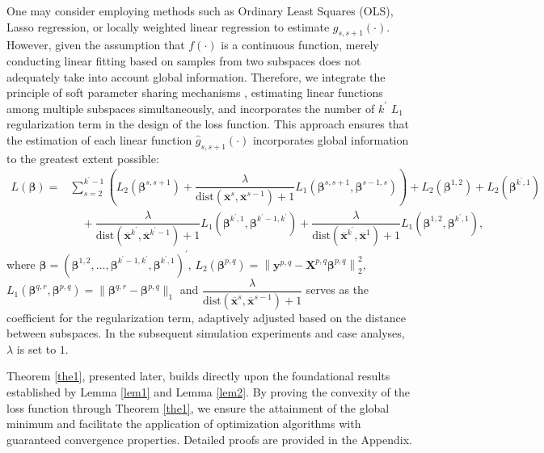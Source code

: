 \documentclass[final,3p,times]{elsarticle}
\begin{document}
One may consider employing methods such as Ordinary Least Squares 
(OLS), Lasso regression, or locally weighted linear regression to 
estimate $g_{s,s+1}(\cdot)$. 
However, given the assumption that $f(\cdot)$ is a continuous 
function, merely conducting linear fitting based on samples from 
two subspaces does not adequately take into account global 
information. Therefore, we integrate the principle of soft 
parameter sharing mechanisms \cite{bib70}, estimating linear functions 
among multiple subspaces simultaneously, and incorporates the number of $k^\prime$ 
$L_1$ regularization term in the design of the loss function. This approach ensures that the estimation of each linear function 
$\hat{g}_{s,s+1}(\cdot)$ incorporates global information to the 
greatest extent possible:
\begin{equation} 
\label{eq8}
\begin{aligned}
L(\boldsymbol{\beta})=
&\sum\limits_{s=2}^{k^\prime-1}
\left(L_2(\boldsymbol{\beta}^{s,s+1})+\dfrac{\lambda}
{\text{dist}(\overline{\boldsymbol{x}}^{s},
\overline{\boldsymbol{x}}^{s-1})+1} 
L_1(\boldsymbol
{\beta}^{s,s+1},\boldsymbol{\beta}^{s-1,s}) \right) 
+L_2(\boldsymbol{\beta}^{1,2})+L_2(\boldsymbol{\beta}
^{k^\prime,1}) \\
&\quad+\dfrac{\lambda}{\text{dist}(
  \overline{\boldsymbol{x}}^{k^\prime},\overline
  {\boldsymbol{x}}^{k^\prime-1})+1}L_1(\boldsymbol{\beta}^{k^\prime,1},
  \boldsymbol{\beta}^{k^\prime-1,k^\prime})+\dfrac{\lambda}{\text{dist}(
\overline{\boldsymbol{x}}^{k^\prime},\overline
{\boldsymbol{x}}^{1})+1}L_1(\boldsymbol{\beta}^{1,2},
\boldsymbol{\beta}^{k^\prime,1}), 
\end{aligned}
\end{equation}
where $\boldsymbol{\beta}=\left(\boldsymbol{\beta}
^{1,2},\ldots,\boldsymbol
{\beta}^{k^\prime-1,k^\prime},\boldsymbol{\beta}^
{k^\prime,1}\right)^\prime$, $L_2(\boldsymbol{\beta}
^{p,q})=\left\|\boldsymbol{y}^{p, q}-\boldsymbol{X}^{p, q} 
\boldsymbol{\beta}^{p, q}\right\|_{2}^{2}$, 
$L_1(\boldsymbol{\beta}^{q,r},\boldsymbol{\beta}^
{p,q})=\|\boldsymbol{\beta}^{q,r}-\boldsymbol{\beta}
^{p,q}\|_1$ and $\dfrac{\lambda}{\text{dist}(
\overline{\boldsymbol{x}}^{s},\overline{\boldsymbol{x}}
^{s-1})+1}$ serves as the coefficient for the 
regularization term, adaptively adjusted based on 
the distance between subspaces. In the subsequent 
simulation experiments and case analyses, $\lambda$ 
is set to $1$.

Theorem \ref{the1}, presented later, builds directly upon the 
foundational results established by Lemma \ref{lem1} and 
Lemma \ref{lem2}. By proving the convexity of the loss 
function through Theorem \ref{the1}, we ensure the attainment 
of the global minimum and facilitate the application 
of optimization algorithms with guaranteed convergence 
properties. Detailed proofs are provided in the 
Appendix.
\end{document}
